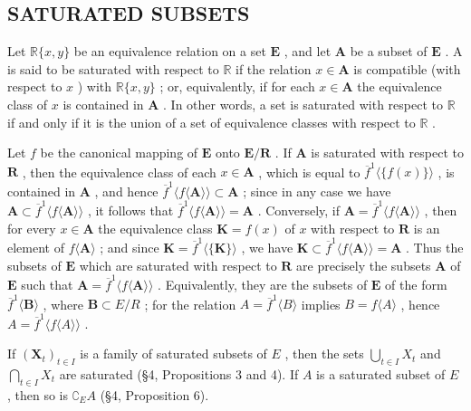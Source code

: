 \subsection{SATURATED SUBSETS}

Let \(\mathbb{R}\{x, y\}\) be an equivalence relation on a set \(\mathbf{E}\) , and let \(\mathbf{A}\) be a subset of \(\mathbf{E}\) . A is said to be saturated with respect to \(\mathbb{R}\) if the relation \(x \in \mathbf{A}\) is compatible (with respect to \(x\) ) with \(\mathbb{R}\{x, y\}\) ; or, equivalently, if for each \(x \in \mathbf{A}\) the equivalence class of \(x\) is contained in \(\mathbf{A}\) . In other words, a set is saturated with respect to \(\mathbb{R}\) if and only if it is the union of a set of equivalence classes with respect to \(\mathbb{R}\) .

Let \(f\) be the canonical mapping of \(\mathbf{E}\) onto \(\mathbf{E} / \mathbf{R}\) . If \(\mathbf{A}\) is saturated with respect to \(\mathbf{R}\) , then the equivalence class of each \(x \in \mathbf{A}\) , which is equal to \(\overline{f}^1 \langle \{f(x)\} \rangle\) , is contained in \(\mathbf{A}\) , and hence \(\overline{f}^1 \langle f\langle \mathbf{A}\rangle \rangle \subset \mathbf{A}\) ; since in any case we have \(\mathbf{A} \subset \overline{f}^1 \langle f\langle \mathbf{A}\rangle \rangle\) , it follows that \(\overline{f}^1 \langle f\langle \mathbf{A}\rangle \rangle = \mathbf{A}\) . Conversely, if \(\mathbf{A} = \overline{f}^1 \langle f\langle \mathbf{A}\rangle \rangle\) , then for every \(x \in \mathbf{A}\) the equivalence class \(\mathbf{K} = f(x)\) of \(x\) with respect to \(\mathbf{R}\) is an element of \(f\langle \mathbf{A}\rangle\) ; and since \(\mathbf{K} = \overline{f}^1 \langle \{\mathbf{K}\}\rangle\) , we have \(\mathbf{K} \subset \overline{f}^1 \langle f\langle \mathbf{A}\rangle \rangle = \mathbf{A}\) . Thus the subsets of \(\mathbf{E}\) which are saturated with respect to \(\mathbf{R}\) are precisely the subsets \(\mathbf{A}\) of \(\mathbf{E}\) such that \(\mathbf{A} = \overline{f}^1 \langle f\langle \mathbf{A}\rangle\rangle\) . Equivalently, they are the subsets of \(\mathbf{E}\) of the form \(\overline{f}^1\langle\mathbf{B}\rangle\) , where \(\mathbf{B} \subset E / R\) ; for the relation \(A = \overline{f}^1\langle B\rangle\) implies \(B = f\langle A\rangle\) , hence \(A = \overline{f}^1\langle f\langle A\rangle\rangle\) .

If \((\mathbf{X}_t)_{t\in I}\) is a family of saturated subsets of \(E\) , then the sets \(\bigcup_{t\in I} X_t\) and \(\bigcap_{t\in I} X_t\) are saturated (§4, Propositions 3 and 4). If \(A\) is a saturated subset of \(E\) , then so is \(\complement_E A\) (§4, Proposition 6).

